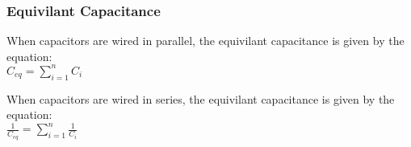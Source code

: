 \subsubsection*{Equivilant Capacitance}
\hspace{.5cm} When capacitors are wired in parallel, the equivilant capacitance is given by the equation:\\
\vbox{
    \large\center
    $C_{eq} = \sum_{i=1}^{n} C_i$
}
\vspace{12pt}

\hspace{.5cm} When capacitors are wired in series, the equivilant capacitance is given by the equation:\\
\vbox{
    \large\center
    $\frac{1}{C_{eq}} = \sum_{i=1}^{n} \frac{1}{C_i}$
}

